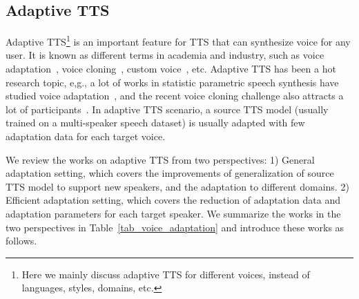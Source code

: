 \documentclass{article}
\begin{document}
\subsection{Adaptive TTS}
\label{sec_advance_adapt}

Adaptive TTS\footnote{Here we mainly discuss adaptive TTS for different voices, instead of languages, styles, domains, etc.} is an important feature for TTS that can synthesize voice for any user. It is known as different terms in academia and industry, such as voice adaptation~\cite{chen2018sample}, voice cloning~\cite{arik2018neural}, custom voice~\cite{chen2021adaspeech}, etc. Adaptive TTS has been a hot research topic, e,g., a lot of works in statistic parametric speech synthesis have studied voice adaptation~\cite{fan2015multi,wu2015study,zhao2016speaker,fan2016speaker,doddipatla2017speaker,huang2018linear}, and the recent voice cloning challenge also attracts a lot of participants~\cite{xie2021multi,hu2021nu,tan2021cuhk,chien2021investigating}. In adaptive TTS scenario, a source TTS model (usually trained on a multi-speaker speech dataset) is usually adapted with few adaptation data for each target voice. 

We review the works on adaptive TTS from two perspectives: 1) General adaptation setting, which covers the improvements of generalization of source TTS model to support new speakers, and the adaptation to different domains. 2) Efficient adaptation setting, which covers the reduction of adaptation data and adaptation parameters for each target speaker. We summarize the works in the two perspectives in Table~\ref{tab_voice_adaptation} and introduce these works as follows.

\end{document}
